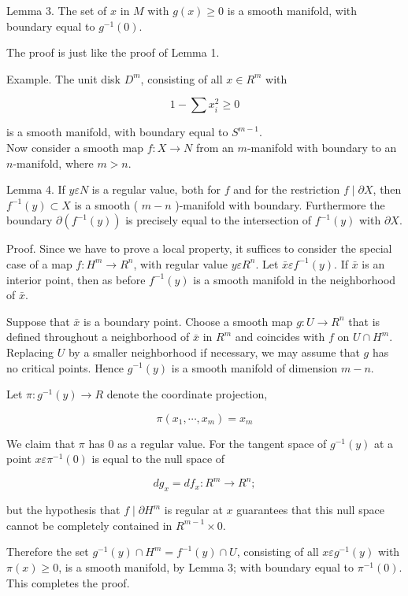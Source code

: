 \documentclass[10pt, letterpaper]{article}
\begin{document}
Lemma 3. The set of $x$ in $M$ with $g(x) \geq 0$ is a smooth manifold, with boundary equal to $g^{-1}(0)$.

The proof is just like the proof of Lemma 1.

Example. The unit disk $D^{m}$, consisting of all $x \in R^{m}$ with

$$
1-\sum x_{i}^{2} \geq 0
$$

is a smooth manifold, with boundary equal to $S^{m-1}$.\\
Now consider a smooth map $f: X \rightarrow N$ from an $m$-manifold with boundary to an $n$-manifold, where $m>n$.



Lemma 4. If $y \varepsilon N$ is a regular value, both for $f$ and for the restriction $f \mid \partial X$, then $f^{-1}(y) \subset X$ is a smooth ( $m-n$ )-manifold with boundary. Furthermore the boundary $\partial\left(f^{-1}(y)\right)$ is precisely equal to the intersection of $f^{-1}(y)$ with $\partial X$.

Proof. Since we have to prove a local property, it suffices to consider the special case of a map $f: H^{m} \rightarrow R^{n}$, with regular value $y \varepsilon R^{n}$. Let $\bar{x} \varepsilon f^{-1}(y)$. If $\bar{x}$ is an interior point, then as before $f^{-1}(y)$ is a smooth manifold in the neighborhood of $\bar{x}$.

Suppose that $\bar{x}$ is a boundary point. Choose a smooth map $g: U \rightarrow R^{n}$ that is defined throughout a neighborhood of $\bar{x}$ in $R^{m}$ and coincides with $f$ on $U \cap H^{m}$. Replacing $U$ by a smaller neighborhood if necessary, we may assume that $g$ has no critical points. Hence $g^{-1}(y)$ is a smooth manifold of dimension $m-n$.

Let $\pi: g^{-1}(y) \rightarrow R$ denote the coordinate projection,

$$
\pi\left(x_{1}, \cdots, x_{m}\right)=x_{m}
$$

We claim that $\pi$ has 0 as a regular value. For the tangent space of $g^{-1}(y)$ at a point $x \varepsilon \pi^{-1}(0)$ is equal to the null space of

$$
d g_{x}=d f_{x}: R^{m} \rightarrow R^{n} ;
$$

but the hypothesis that $f \mid \partial H^{m}$ is regular at $x$ guarantees that this null space cannot be completely contained in $R^{m-1} \times 0$.

Therefore the set $g^{-1}(y) \cap H^{m}=f^{-1}(y) \cap U$, consisting of all $x \varepsilon g^{-1}(y)$ with $\pi(x) \geq 0$, is a smooth manifold, by Lemma 3; with boundary equal to $\pi^{-1}(0)$. This completes the proof.
\end{document}
